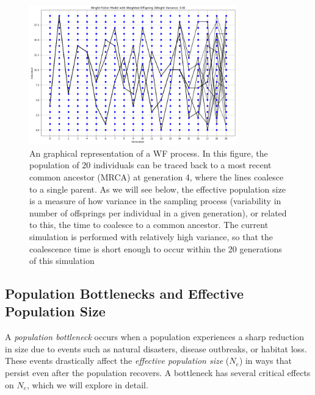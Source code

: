 \documentclass[10pt,a4paper]{scrbook}
\begin{document}
\begin{figure}[htbp]
    \centering
    \includegraphics[width=0.8\textwidth]{WF1.png}  %
    \caption{An graphical representation of a WF process. In this figure, the population of 20 individuals can be traced back to a most recent common ancestor (MRCA) at generation 4, where the lines coalesce to a single parent. As we will see below, the effective population size is a measure of how variance in the sampling process (variability in number of offsprings per individual in a given generation), or related to this, the time to coalesce to a common ancestor. The current simulation is performed with relatively high variance, so that the coalescence time is short enough to occur within the 20 generations of this simulation}
    \label{fig:WF1}
\end{figure}

\subsection{Population Bottlenecks and Effective Population Size}

A \textit{population bottleneck} occurs when a population experiences a sharp reduction in size due to events such as natural disasters, disease outbreaks, or habitat loss. These events drastically affect the \emph{effective population size} (\(N_e\)) in ways that persist even after the population recovers. A bottleneck has several critical effects on \(N_e\), which we will explore in detail.
\end{document}
